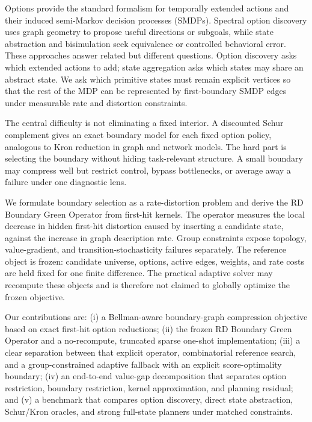 \documentclass[10pt]{article}
\begin{document}
Options provide the standard formalism for temporally extended actions and
their induced semi-Markov decision processes (SMDPs)\citep{sutton1999options}.
Spectral option discovery uses graph geometry to propose useful directions or
subgoals\citep{machado2017laplacian}, while state abstraction and bisimulation
seek equivalence or controlled behavioral error\citep{li2006abstraction,ferns2011bisimulation}.
These approaches answer related but different questions. Option discovery asks
which extended actions to add; state aggregation asks which states may share an
abstract state. We ask which primitive states must remain explicit vertices so
that the rest of the MDP can be represented by first-boundary SMDP edges under
measurable rate and distortion constraints.

The central difficulty is not eliminating a fixed interior. A discounted Schur
complement gives an exact boundary model for each fixed option policy, analogous
to Kron reduction in graph and network models\citep{dorfler2013kron}. The hard
part is selecting the boundary without hiding task-relevant structure. A small
boundary may compress well but restrict control, bypass bottlenecks, or average
away a failure under one diagnostic lens.

We formulate boundary selection as a rate-distortion problem and derive the RD
Boundary Green Operator from first-hit kernels. The operator measures the local
decrease in hidden first-hit distortion caused by inserting a candidate state,
against the increase in graph description rate. Group constraints expose
topology, value-gradient, and transition-stochasticity failures separately. The
reference object is frozen: candidate universe, options, active edges, weights,
and rate costs are held fixed for one finite difference. The practical adaptive
solver may recompute these objects and is therefore not claimed to globally
optimize the frozen objective.

Our contributions are: (i) a Bellman-aware boundary-graph compression objective
based on exact first-hit option reductions; (ii) the frozen RD Boundary Green
Operator and a no-recompute, truncated sparse one-shot implementation; (iii) a
clear separation between that explicit operator, combinatorial reference
search, and a group-constrained adaptive fallback with an explicit
score-optimality boundary; (iv) an end-to-end value-gap decomposition that separates option restriction,
boundary restriction, kernel approximation, and planning residual; and (v) a
benchmark that compares option discovery, direct state abstraction, Schur/Kron
oracles, and strong full-state planners under matched constraints.
\end{document}

